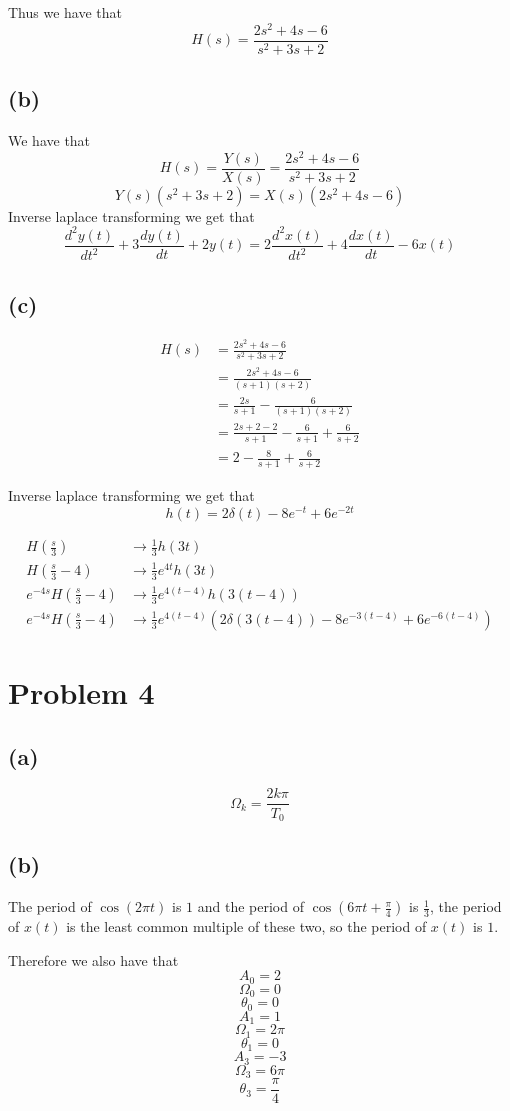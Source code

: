 \documentclass[12pt]{article}
\begin{document}
Thus we have that
$$H(s)=\boxed{\frac{2s^2+4s-6}{s^2+3s+2}}$$
\subsection*{(b)}
We have that
$$H(s)=\frac{Y(s)}{X(s)}=\frac{2s^2+4s-6}{s^2+3s+2}$$
$$Y(s)(s^2+3s+2)=X(s)(2s^2+4s-6)$$
Inverse laplace transforming we get that
$$\boxed{\frac{d^2y(t)}{dt^2}+3\frac{dy(t)}{dt}+2y(t)=2\frac{d^2x(t)}{dt^2}+4\frac{dx(t)}{dt}-6x(t)}$$
\subsection*{(c)}
\begin{align*}
H(s)&=\frac{2s^2+4s-6}{s^2+3s+2}\\
&=\frac{2s^2+4s-6}{(s+1)(s+2)}\\
&=\frac{2s}{s+1}-\frac{6}{(s+1)(s+2)}\\
&=\frac{2s+2-2}{s+1}-\frac{6}{s+1}+\frac{6}{s+2}\\
&=2-\frac{8}{s+1}+\frac{6}{s+2}
\end{align*}

Inverse laplace transforming we get that
$$h(t)=2\delta(t)-8e^{-t}+6e^{-2t}$$

\begin{align*}
H(\frac{s}{3})&\to \frac{1}{3}h(3t)\\
H(\frac{s}{3}-4)&\to\frac{1}{3}e^{4t}h(3t)\\
e^{-4s}H(\frac{s}{3}-4)&\to\frac{1}{3}e^{4(t-4)}h(3(t-4))\\
e^{-4s}H(\frac{s}{3}-4)&\to\boxed{\frac{1}{3}e^{4(t-4)}\left(2\delta(3(t-4))-8e^{-3(t-4)}+6e^{-6(t-4)}\right)}
\end{align*}
\section*{Problem 4}
\subsection*{(a)}
$$\Omega_k=\boxed{\frac{2k\pi}{T_0}}$$
\subsection*{(b)}
The period of $\cos(2\pi t)$ is $1$ and the period of $\cos(6\pi t +\frac{\pi}{4})$ is $\frac{1}{3}$, the period of $x(t)$ is the least common multiple of these two, so the period of $x(t)$ is $1$.

Therefore we also have that 
$$A_0=2$$
$$\Omega_0=0$$
$$\theta_0=0$$
$$A_1=1$$
$$\Omega_1=2\pi$$
$$\theta_1=0$$
$$A_3=-3$$
$$\Omega_3=6\pi$$
$$\theta_3=\frac{\pi}{4}$$
\end{document}
